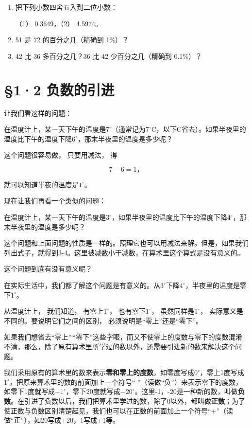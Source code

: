 \begin{enumerate}[start=21]
\item
  把下列小数四舍五入到二位小数：

  （1） 0.3649，\qquad（2） 4.5974。
\item
  51 是 72 的百分之几（精确到 1\%）？
\item
  42 比 36 多百分之几？36 比 42 少百分之几（精确到 0.1\%）？
\end{enumerate}

\section{§1·2 负数的引进}

让我们看这样的问题：

在温度计上，某一天下午的温度是\(7^{\circ}\)（通常记为\(7^{\circ} \mathrm{C}\)，以下\(\mathrm{C}\)省去）。如果半夜里的温度比下午的温度下降\(6^{\circ}\)，那末半夜里的温度是多少呢？

这个问题很容易做， 只要用减法， 得

\[
7 - 6 = 1\text{，}
\]

就可以知道半夜的温度是\(1^{\circ}\)。

现在让我们再看一个类似的问题：

在温度计上，某一天下午的温度是\(3^{\circ}\)，如果半夜里的温度比下午的温度下降\(4^{\circ}\)，那末半夜里的温度是多少呢？

这个问题和上面问题的性质是一样的。照理它也可以用减法来解。但是，如果我们列出式子，就得到3-4。这里被减数小于减数，在算术里这个算式是没有意义的。

这个问题到底有没有意义呢？

在实际生活中，我们都了解这个问题是有意义的。从\(3^{\circ}\)下降\(4^{\circ}\)，半夜里的温度是零下\(1^{\circ}\)。

从温度计上， 我们知道， 有零上\(1^{\circ}\)， 也有零下\(1^{\circ}\)，
虽然同样是\(1^{\circ}\)， 实际意义是不同的。要说明它们之间的区别，
必须说明是``零上''还是``零下''。

如果我们想省去``零上''\,``零下''这些字眼，而又不使零上的度数与零下的度数混淆不清，那么，除了原有算术里所学过的数以外，还需要引进新的数来解决这个问题。

我们采用原有的算术里的数来表示\textbf{零和零上的度数}，如零度写成\(0^{\circ}\)，零上1度写成\(1^{\circ}\)，把原来算术里的数的前面加上一个符号``-''（读做``负''）来表示零下的度数，如零下1度就写成\(-1^{\circ}\)，零下20度就写成\(-20^{\circ}\)。这里-1，-20是一种新的数，叫做\textbf{负数}。在引进了负数以后，我们把算术里学过的数，除了0以外，都叫做\textbf{正数}；为了使正数与负数区别清楚起见，我们也可以在正数的前面加上一个符号``+''（读做``正''），如20写成+20，1写成+1等。

